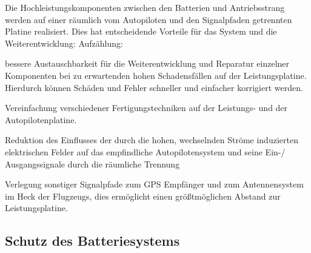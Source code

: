 Die  Hochleistungskomponenten zwischen den Batterien und Antriebsstrang werden auf einer räumlich vom Autopiloten und den Signalpfaden getrennten Platine realisiert. Dies hat entscheidende Vorteile für das System und die Weiterentwicklung:
Aufzählung:

bessere Austauschbarkeit für die Weiterentwicklung und Reparatur einzelner Komponenten bei zu erwartenden hohen Schadensfällen auf der Leistungsplatine. Hierdurch können Schäden und Fehler schneller und einfacher korrigiert werden.

Vereinfachung verschiedener Fertigungstechniken auf der Leistungs- und der Autopilotenplatine. 

Reduktion des Einflusses der durch die hohen, wechselnden Ströme induzierten elektrischen Felder auf das empfindliche Autopilotensystem und seine Ein-/ Ausgangssignale durch die räumliche Trennung

Verlegung sonstiger Signalpfade zum GPS Empfänger und zum Antennensystem im Heck der Flugzeugs, dies ermöglicht einen größtmöglichen Abstand zur Leistungsplatine.


\begin{comment}
Die  Hochleistungskomponenten im Pfad von den Batterien zum Antriebsstrang werden auf einer von dem Autopiloten und den Signalpfaden räumlich getrennten Platine realisiert. Dies bringt eine Reihe von Vorteilen für das System und die Entwicklung mit sich.

Es ist eine bessere Austauschbarkeit, Weiterentwicklung und Reparatur für einzelne Komponenten möglich.
Die Schadenshäufigkeit und deren Folgen sind auf der Leistungsplatine größer und graviernder was einen häufigeren  Austausch und eine Weiterentwicklung zur Fehlerkorretur nötig macht.

Der Einsatz verschiedener Fertigungstechniken auf der Leistungs- und der Autopilotenplatine wird vereinfacht.

Die räumliche Trennung verringert den Einfluss der durch die hohen wechselnden Ströme verursachten Elektrischen Felder auf das empfindliche Autopilotensystem und seine Ein- und Ausgangssignale.

Sonstige Signalpfade werden im Heck der Flugzeugs zu GPS Empfänger und Antennensystem verlegt, um einen größtmöglichen Abstand zur Leistungsplatine zu gewährleisten.
\end{comment}


\subsection{Schutz des Batteriesystems}

